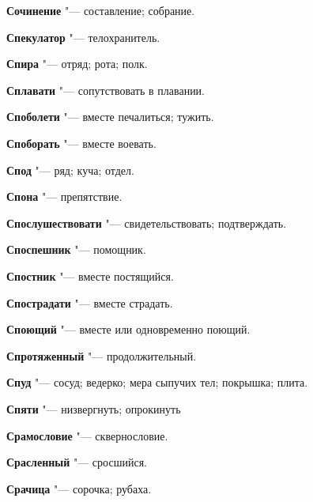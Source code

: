 \begin{mymulticols}{2}
\noindent\textbf{Сочинение} "--- составление; собрание. 




\noindent\textbf{Спекулатор} "--- телохранитель. 




\noindent\textbf{Спира} "--- отряд; рота; полк. 




\noindent\textbf{Сплавати} "--- сопутствовать в плавании. 




\noindent\textbf{Споболети} "--- вместе печалиться; тужить. 




\noindent\textbf{Споборать} "--- вместе воевать. 




\noindent\textbf{Спод} "--- ряд; куча; отдел. 




\noindent\textbf{Спона} "--- препятствие. 




\noindent\textbf{Спослушествовати} "--- свидетельствовать; подтверждать. 




\noindent\textbf{Споспешник} "--- помощник. 




\noindent\textbf{Спостник} "--- вместе постящийся. 




\noindent\textbf{Спострадати} "--- вместе страдать. 




\noindent\textbf{Споющий} "--- вместе или одновременно поющий. 




\noindent\textbf{Спротяженный} "--- продолжительный. 




\noindent\textbf{Спуд} "--- сосуд; ведерко; мера сыпучих тел; покрышка; плита. 




\noindent\textbf{Спяти} "--- низвергнуть; опрокинуть 




\noindent\textbf{Срамословие} "--- сквернословие. 




\noindent\textbf{Срасленный} "--- сросшийся. 




\noindent\textbf{Срачица} "--- сорочка; рубаха. 





\end{mymulticols}
